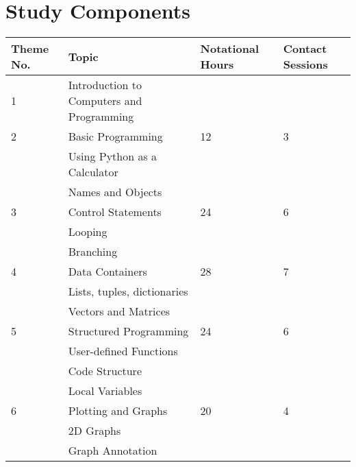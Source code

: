 \section{Study Components}
        \begin{table}[!h]
             \begin{tabular}{|p{1.4cm}|l|p{2cm}|p{2cm}|}
                 \hline
                 {\bf Theme No.} & {\bf Topic} & 
                    {\bf Notational Hours} & {\bf Contact Sessions} \\
                 \hline
                 1  & Introduction to Computers and Programming &    &   \\
                 \hline
                 2  & Basic Programming                         & 12 & 3 \\
                    & \qquad Using Python as a Calculator       &    &   \\
                    & \qquad Names and Objects                  &    &   \\
                 \hline
                 3  & Control Statements                        & 24 & 6 \\
                    & \qquad Looping                            &    &   \\
                    & \qquad Branching                          &    &   \\                 
                 \hline
                 4  & Data Containers                           & 28 & 7 \\
                    & \qquad Lists, tuples, dictionaries        &    &   \\
                    & \qquad Vectors and Matrices               &    &   \\                 
                 \hline
                 5  & Structured Programming                    & 24 & 6 \\
                    & \qquad User-defined Functions             &    &   \\                 
                    & \qquad Code Structure                     &    &   \\
                    & \qquad Local Variables                    &    &   \\
                 \hline
                 6  & Plotting and Graphs                       & 20 & 4 \\
                    & \qquad 2D Graphs                          &    &   \\
                    & \qquad Graph Annotation                   &    &   \\

\end{tabular}
\end{table}
